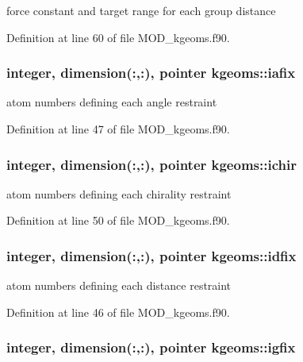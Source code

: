 force constant and target range for each group distance 



Definition at line 60 of file M\-O\-D\-\_\-kgeoms.\-f90.

\hypertarget{classkgeoms_a639ffbfb70ed76eb33630eea7fb28fb1}{
\subsubsection[{iafix}]{\setlength{\rightskip}{0pt plus 5cm}integer, dimension(\-:,\-:), pointer kgeoms\-::iafix}}\label{classkgeoms_a639ffbfb70ed76eb33630eea7fb28fb1}


atom numbers defining each angle restraint 



Definition at line 47 of file M\-O\-D\-\_\-kgeoms.\-f90.

\hypertarget{classkgeoms_a00202505a33b4933e92075e2977f11b6}{
\subsubsection[{ichir}]{\setlength{\rightskip}{0pt plus 5cm}integer, dimension(\-:,\-:), pointer kgeoms\-::ichir}}\label{classkgeoms_a00202505a33b4933e92075e2977f11b6}


atom numbers defining each chirality restraint 



Definition at line 50 of file M\-O\-D\-\_\-kgeoms.\-f90.

\hypertarget{classkgeoms_aaecf0a0bc8604b15f9e2c67822ad85af}{
\subsubsection[{idfix}]{\setlength{\rightskip}{0pt plus 5cm}integer, dimension(\-:,\-:), pointer kgeoms\-::idfix}}\label{classkgeoms_aaecf0a0bc8604b15f9e2c67822ad85af}


atom numbers defining each distance restraint 



Definition at line 46 of file M\-O\-D\-\_\-kgeoms.\-f90.

\hypertarget{classkgeoms_af5b1134556ec058fbc95d41a090abd69}{
\subsubsection[{igfix}]{\setlength{\rightskip}{0pt plus 5cm}integer, dimension(\-:,\-:), pointer kgeoms\-::igfix}}\label{classkgeoms_af5b1134556ec058fbc95d41a090abd69}


